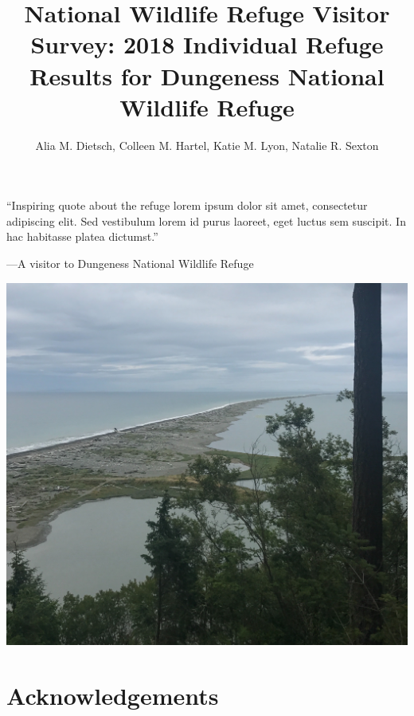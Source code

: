 \documentclass[]{book}
\title{National Wildlife Refuge Visitor Survey: 2018 Individual Refuge Results
for Dungeness National Wildlife Refuge}
\author{Alia M. Dietsch, Colleen M. Hartel, Katie M. Lyon, Natalie R. Sexton}
\date{}
\begin{document}
\maketitle

{
\setcounter{tocdepth}{1}
\tableofcontents
}
\chapter*{}\label{section}

``Inspiring quote about the refuge lorem ipsum dolor sit amet,
consectetur adipiscing elit. Sed vestibulum lorem id purus laoreet, eget
luctus sem suscipit. In hac habitasse platea dictumst.''

---A visitor to Dungeness National Wildlife Refuge

\begin{center}\includegraphics{refuge-info/Dungeness National Wildlife Refuge/cover} \end{center}

\chapter*{Acknowledgements}\label{acknowledgements}
\end{document}
